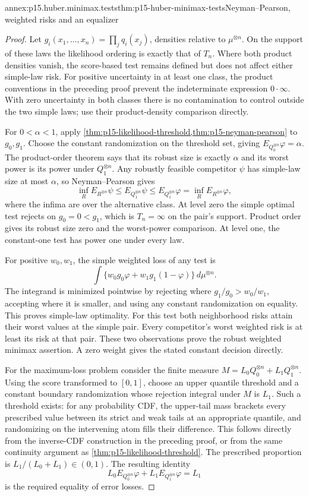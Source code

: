 \begin{annexitem}{annex:p15.huber.minimax.tests}{thm:p15-huber-minimax-tests}{Neyman--Pearson, weighted risks and an equalizer}
\begin{proof}
Let \(g_i(x_1,\ldots,x_n)=\prod_jq_i(x_j)\), densities relative to
\(\mu^{\otimes n}\). On the support of these laws the likelihood
ordering is exactly that of \(T_n\). Where both product densities
vanish, the score-based test remains defined but does not affect
either simple-law risk.
For positive uncertainty in at least one class, the product conventions
in the preceding proof prevent the indeterminate expression
\(0\cdot\infty\). With zero uncertainty in both classes there is
no contamination to control outside the two simple laws; use their
product-density comparison directly.

For \(0<\alpha<1\), apply
\cref{thm:p15-likelihood-threshold,thm:p15-neyman-pearson}
to \(g_0,g_1\). Choose the constant randomization on the threshold
set, giving \(E_{Q_0^{\otimes n}}\varphi=\alpha\).
The product-order theorem says that its robust size is exactly
\(\alpha\) and its worst power is its power under \(Q_1^{\otimes n}\).
Any robustly feasible competitor \(\psi\) has simple-law size at most
\(\alpha\), so Neyman--Pearson gives
\[
 \inf_R E_{R^{\otimes n}}\psi
 \leq E_{Q_1^{\otimes n}}\psi
 \leq E_{Q_1^{\otimes n}}\varphi
 =\inf_R E_{R^{\otimes n}}\varphi ,
\]
where the infima are over the alternative class.
At level zero the simple optimal test rejects on \(g_0=0<g_1\),
which is \(T_n=\infty\) on the pair's support. Product order gives
its robust size zero and the worst-power comparison. At level one,
the constant-one test has power one under every law.

For positive \(w_0,w_1\), the simple weighted loss of any test is
\[
 \int\{w_0g_0\varphi+w_1g_1(1-\varphi)\}\,d\mu^{\otimes n}.
\]
The integrand is minimized pointwise by rejecting where
\(g_1/g_0>w_0/w_1\), accepting where it is smaller, and using any
constant randomization on equality. This proves simple-law optimality.
For this test both neighborhood risks attain their worst values at
the simple pair. Every competitor's worst weighted risk is at least
its risk at that pair. These two observations prove the robust
weighted minimax assertion. A zero weight gives the stated constant
decision directly.

For the maximum-loss problem consider the finite measure
\(M=L_0Q_0^{\otimes n}+L_1Q_1^{\otimes n}\).
Using the score transformed to \([0,1]\), choose an upper quantile
threshold and a constant boundary randomization whose rejection
integral under \(M\) is \(L_1\).
Such a threshold exists: for any probability CDF, the upper-tail
mass brackets every prescribed value between its strict and weak
tails at an appropriate quantile, and randomizing on the intervening
atom fills their difference. This follows directly from the inverse-CDF
construction in the preceding proof, or from the same continuity
argument as \cref{thm:p15-likelihood-threshold}.
The prescribed proportion is \(L_1/(L_0+L_1)\in(0,1)\).
The resulting identity
\[
 L_0E_{Q_0^{\otimes n}}\varphi+
 L_1E_{Q_1^{\otimes n}}\varphi=L_1
\]
is the required equality of error losses.


\end{proof}
\end{annexitem}
